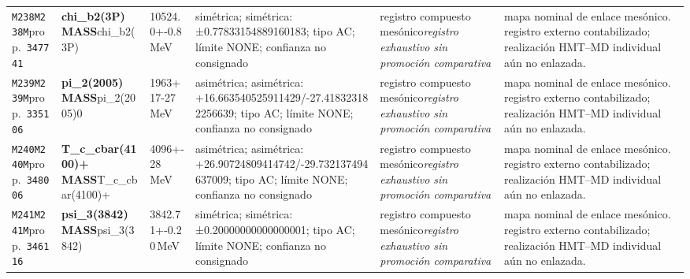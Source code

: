 \begin{landscape}
\begin{longtable}{L{1.85cm}L{4.45cm}L{2.35cm}L{4.05cm}L{3.35cm}L{7.15cm}}
\texttt{M238}\newline \texttt{M238M}\newline prop.\ \texttt{347741} & \textbf{chi\_\allowbreak{}b2(3P) MASS}\newline chi\_\allowbreak{}b2(3P) & 10524.0+-0.8\,MeV & simétrica; simétrica: ±0.77833154889160183; tipo AC; límite NONE; confianza no consignado & registro compuesto mesónico\newline \emph{registro exhaustivo sin promoción comparativa} & mapa nominal de enlace mesónico. registro externo contabilizado; realización HMT--MD individual aún no enlazada. \\
\texttt{M239}\newline \texttt{M239M}\newline prop.\ \texttt{335106} & \textbf{pi\_\allowbreak{}2(2005) MASS}\newline pi\_\allowbreak{}2(2005)0 & 1963+17-27\,MeV & asimétrica; asimétrica: +16.663540525911429/-27.418323182256639; tipo AC; límite NONE; confianza no consignado & registro compuesto mesónico\newline \emph{registro exhaustivo sin promoción comparativa} & mapa nominal de enlace mesónico. registro externo contabilizado; realización HMT--MD individual aún no enlazada. \\
\texttt{M240}\newline \texttt{M240M}\newline prop.\ \texttt{348006} & \textbf{T\_\allowbreak{}c\_\allowbreak{}cbar(4100)+ MASS}\newline T\_\allowbreak{}c\_\allowbreak{}cbar(4100)+ & 4096+-28\,MeV & asimétrica; asimétrica: +26.90724809414742/-29.732137494637009; tipo AC; límite NONE; confianza no consignado & registro compuesto mesónico\newline \emph{registro exhaustivo sin promoción comparativa} & mapa nominal de enlace mesónico. registro externo contabilizado; realización HMT--MD individual aún no enlazada. \\
\texttt{M241}\newline \texttt{M241M}\newline prop.\ \texttt{346116} & \textbf{psi\_\allowbreak{}3(3842) MASS}\newline psi\_\allowbreak{}3(3842) & 3842.71+-0.20\,MeV & simétrica; simétrica: ±0.20000000000000001; tipo AC; límite NONE; confianza no consignado & registro compuesto mesónico\newline \emph{registro exhaustivo sin promoción comparativa} & mapa nominal de enlace mesónico. registro externo contabilizado; realización HMT--MD individual aún no enlazada. \\

\end{longtable}
\end{landscape}

